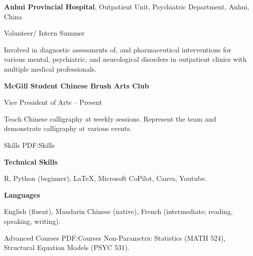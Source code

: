 \documentclass[a4paper,12pt]{article}
\begin{document}
\begin{Body}
\BigGap
{\textbf{Anhui Provincial Hospital}}, Outpatient Unit, Psychiatric Department, Anhui, China

Volunteer/ Intern 
\hfill
Summer 

\begin{Detail}
Involved in diagnostic assessments of, and pharmaceutical interventions for various mental, psychiatric, and neurological disorders in outpatient clinics with multiple medical professionals. 
\end{Detail}

\BigGap
\Entry
{\textbf{McGill Student Chinese Brush Arts Club}}

Vice President of Arts
\hfill
{} -- Present

\begin{Detail}
\SubBulletItem
Teach Chinese calligraphy at weekly sessions.
\SubBulletItem
Represent the team and demonstrate calligraphy at various events.
\end{Detail}





{Skills}
{PDF:Skills}

\Entry
{\textbf{Technical Skills}}

R, Python (beginner), {\LaTeX}, Microsoft CoPilot, Canva, Youtube.

\Gap

\Entry
{\textbf{Languages}}

English (fluent), Mandarin Chinese (native), French (intermediate; reading, speaking, writing).

{Advanced Courses}
{PDF:Courses}
\Entry
Non-Parametric Statistics (MATH 524), Structural Equation Models (PSYC 531).

\end{Body}
\end{document}
